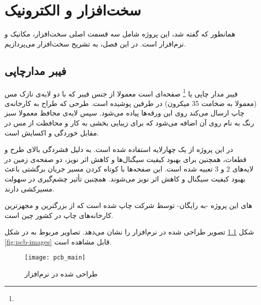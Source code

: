 \chapter{سخت‌افزار و الکترونیک}

همانطور که گفته شد، این پروژه شامل سه قسمت اصلی سخت‌افزار، مکانیک و نرم‌افزار است. در این فصل، به تشریح سخت‌افزار می‌پردازیم.

\section{فیبر مدارچاپی}
	فیبر مدار چاپی یا \pcb\footnote{} صفحه‌ای است معمولا از جنس فیبر  که با دو لایه‌ی نازک مس (معمولا به ضخامت 35 میکرون) در طرفین پوشیده است. طرحی که طراح به کارخانه‌ی چاپ \pcbf ارسال می‌کند روی این ورقه‌ها پیاده می‌شود. سپس لایه‌ی محافظ معمولا سبز رنگ به نام  روی آن اضافه می‌شود که برای زیبایی بخشی به کار و محافظت از مس در مقابل خوردگی و اکسایش است.
	
	در این پروژه از یک \pcbf چهارلایه استفاده شده است. به دلیل فشردگی بالای طرح و قطعات، همچنین برای بهبود کیفیت سیگنال‌ها و کاهش اثر نویز، دو صفحه‌ی زمین در لایه‌های 2 و 3 تعبیه شده است. این صفحه‌ها با کوتاه کردن مسیر جریان برگشتی باعث بهبود کیفیت سیگنال و کاهش اثر نویز می‌شوند. همچنین تأثیر چشم‌گیری در سهولت مسیرکشی \pcbf دارند.

 \pcbf 
 های این پروژه -به رایگان- توسط شرکت \cite{PCBWay} چاپ شده است که از بزرگترین و مجهزترین کارخانه‌های چاپ \pcbf در کشور چین است.
 
 شکل \ref{fig:pcb_design}  تصویر \pcbf طراحی شده در نرم‌افزار  را نشان می‌دهد. تصاویر مربوط به \pcbf در شکل \ref{fig:pcb-images} قابل مشاهده است.
 
 \begin{figure}[h]
 	\centering
 	\texttt{[image: pcb\_main]}
 	\caption{\pcbf طراحی شده در نرم‌افزار }
 	\label{fig:pcb_design}
 \end{figure}
 
